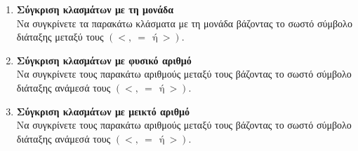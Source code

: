 \documentclass[twoside,nofonts,internet]{askhseis}
\begin{document}
\begin{enumerate}
\begin{multicols}{3}
\begin{rlist}[leftmargin=3mm]
\end{rlist}
\end{multicols}
\item \textbf{Σύγκριση κλασμάτων με τη μονάδα}\\
Να συγκρίνετε τα παρακάτω κλάσματα με τη μονάδα βάζοντας το σωστό σύμβολο διάταξης μεταξύ τους $ (<,\ =\ \ \textrm{ή}\ >) $.
\begin{multicols}{4}
\end{multicols}
\item \textbf{Σύγκριση κλασμάτων με φυσικό αριθμό}\\
Να συγκρίνετε τους παρακάτω αριθμούς μεταξύ τους βάζοντας το σωστό σύμβολο διάταξης ανάμεσά τους $ (<,\ =\ \ \textrm{ή}\ >) $.
\begin{multicols}{3}
\end{multicols}
\item \textbf{Σύγκριση κλασμάτων με μεικτό αριθμό}\\
Να συγκρίνετε τους παρακάτω αριθμούς μεταξύ τους βάζοντας το σωστό σύμβολο διάταξης ανάμεσά τους $ (<,\ =\ \ \textrm{ή}\ >) $.
\begin{multicols}{3}
\end{multicols}
\end{enumerate}
\end{document}
